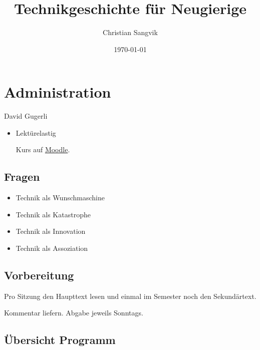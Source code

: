 \documentclass[a4paper,ngerman,11pt]{scrartcl}
\author{Christian Sangvik}
\date{\today}
\title{Technikgeschichte für Neugierige}
\begin{document}
\maketitle
\tableofcontents


\section{Administration}
\label{sec-1}

David Gugerli

\begin{itemize}
\item Lektürelastig

Kurs auf \href{https://moodle-app2.let.ethz.ch/course/view.php?id\%3D4214}{Moodle}.
\end{itemize}

\subsection{Fragen}
\label{sec-1-1}

\begin{itemize}
\item Technik als Wunschmaschine
\item Technik als Katastrophe
\item Technik als Innovation
\item Technik als Assoziation
\end{itemize}

\subsection{Vorbereitung}
\label{sec-1-2}

Pro Sitzung den Haupttext lesen und einmal im Semester noch den
Sekundärtext.

Kommentar liefern. Abgabe jeweils Sonntags.

\subsection{Übersicht Programm}
\label{sec-1-3}
\end{document}
